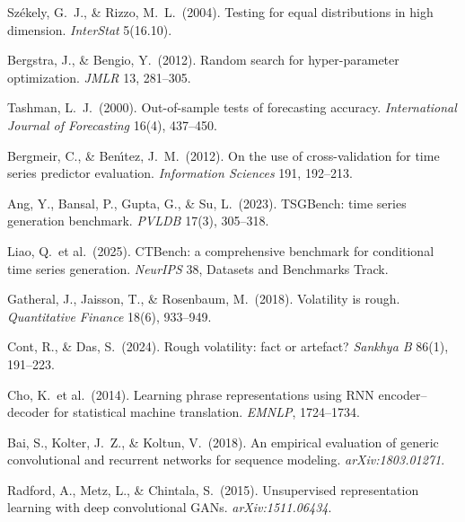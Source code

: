 \documentclass[10pt]{article}
\begin{document}
{\begin{enumerate}[label={\textbf{[\arabic*]}},leftmargin=2.8em,itemsep=4pt,parsep=0pt,topsep=2pt]
\item \hypertarget{R:11}{}%
  Sz\'{e}kely, G.\ J., \& Rizzo, M.\ L.\ (2004). Testing for equal distributions in high dimension. \textit{InterStat} 5(16.10).

\item \hypertarget{R:12}{}%
  Bergstra, J., \& Bengio, Y.\ (2012). Random search for hyper-parameter optimization. \textit{JMLR} 13, 281--305.

\item \hypertarget{R:13}{}%
  Tashman, L.\ J.\ (2000). Out-of-sample tests of forecasting accuracy. \textit{International Journal of Forecasting} 16(4), 437--450.

\item \hypertarget{R:14}{}%
  Bergmeir, C., \& Ben\'{\i}tez, J.\ M.\ (2012). On the use of cross-validation for time series predictor evaluation. \textit{Information Sciences} 191, 192--213.

\item \hypertarget{R:15}{}%
  Ang, Y., Bansal, P., Gupta, G., \& Su, L.\ (2023). TSGBench: time series generation benchmark. \textit{PVLDB} 17(3), 305--318.

\item \hypertarget{R:16}{}%
  Liao, Q.\ et al.\ (2025). CTBench: a comprehensive benchmark for conditional time series generation. \textit{NeurIPS} 38, Datasets and Benchmarks Track.

\item \hypertarget{R:17}{}%
  Gatheral, J., Jaisson, T., \& Rosenbaum, M.\ (2018). Volatility is rough. \textit{Quantitative Finance} 18(6), 933--949.

\item \hypertarget{R:18}{}%
  Cont, R., \& Das, S.\ (2024). Rough volatility: fact or artefact? \textit{Sankhya B} 86(1), 191--223.

\item \hypertarget{R:19}{}%
  Cho, K.\ et al.\ (2014). Learning phrase representations using RNN encoder--decoder for statistical machine translation. \textit{EMNLP}, 1724--1734.

\item \hypertarget{R:20}{}%
  Bai, S., Kolter, J.\ Z., \& Koltun, V.\ (2018). An empirical evaluation of generic convolutional and recurrent networks for sequence modeling. \textit{arXiv:1803.01271}.

\item \hypertarget{R:21}{}%
  Radford, A., Metz, L., \& Chintala, S.\ (2015). Unsupervised representation learning with deep convolutional GANs. \textit{arXiv:1511.06434}.


\end{enumerate}}
\end{document}
